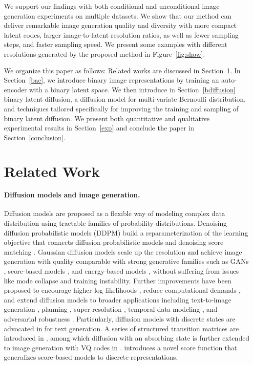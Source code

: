 \documentclass[10pt,twocolumn,letterpaper]{article}
\begin{document}
We support our findings with both conditional and unconditional image generation experiments on multiple datasets. We show that our method can deliver remarkable image generation quality and diversity with more compact latent codes, larger image-to-latent resolution ratios, as well as fewer sampling steps, and faster sampling speed.
We present some examples with different resolutions generated by the proposed method in Figure~\ref{fig:show}. 

We organize this paper as follows:
Related works are discussed in Section~\ref{related}.
In Section~\ref{bae}, we introduce binary image representations by training an auto-encoder with a binary latent space. 
We then introduce in Section~\ref{bdiffusion} binary latent diffusion, a diffusion model for multi-variate Bernoulli distribution, and techniques tailored specifically for improving the training and sampling of binary latent diffusion. We present both quantitative and qualitative experimental results in Section~\ref{exp} and conclude the paper in Section~\ref{conclusion}.


\section{Related Work}
\label{related}

\paragraph{Diffusion models and image generation.}

Diffusion models \cite{diffusion} are proposed as a flexible way of modeling complex data distribution using tractable families of probability distributions. 
Denoising diffusion probabilistic models (DDPM) \cite{ddpm} build a reparameterization of the learning objective that connects diffusion probabilistic models and denoising score matching \cite{score}. Gaussian diffusion models scale up the resolution and achieve image generation with quality comparable with strong generative families such as GANs \cite{stylegan2,sngan,biggan}, score-based models \cite{score,scorev2,song2020score}, and energy-based models \cite{clsy,ebm}, without suffering from issues like mode collapse and training instability. 
Further improvements have been proposed to encourage higher log-likelihoods \cite{improved_ddpm}, reduce computational demands \cite{latent}, and extend diffusion models to broader applications including text-to-image generation \cite{dalle2,imagen}, planning \cite{janner2022planning}, super-resolution \cite{superres}, temporal data modeling \cite{alcaraz2022diffusion,kong2020diffwave,tashiro2021csdi}, and adversarial robustness \cite{blau2022threat,wang2022guided}.
Particularly, diffusion models with discrete states are advocated in \cite{structured} for text generation. A series of structured transition matrices are introduced in \cite{structured}, among which diffusion with an absorbing state is further extended to image generation with VQ codes in \cite{unleashing}. \cite{meng2022concrete} introduces a novel score function that generalizes score-based models to discrete representations.
\end{document}
